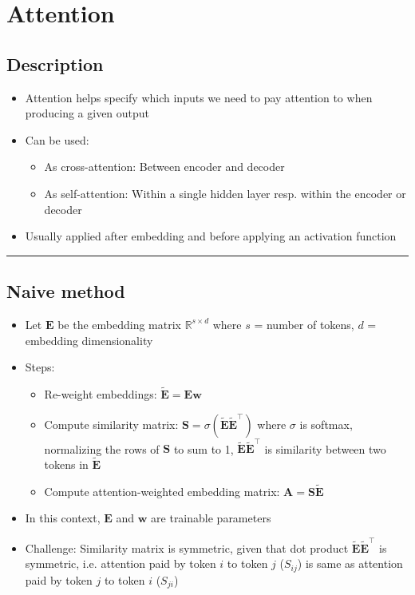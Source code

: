 \section{Attention}
\subsection*{Description}
\begin{itemize}
    \item Attention helps specify which inputs we need to pay attention to when producing a given output
    \item Can be used:
    \begin{itemize}
        \item As cross-attention: Between encoder and decoder
        \item As self-attention: Within a single hidden layer resp. within the encoder or decoder
    \end{itemize}
    \item Usually applied after embedding and before applying an activation function
\end{itemize}

{\color{black}\hrule height 0.001mm}

\subsection*{Naive method}
\begin{itemize}
    \item Let $\boldsymbol{E}$ be the embedding matrix $\mathbb{R}^{s \times d}$ where $s$ = number of tokens, $d$ = embedding dimensionality
    \item Steps:
    \begin{itemize}
        \item Re-weight embeddings: $\tilde{\boldsymbol{E}} = \boldsymbol{E} \boldsymbol{w}$
        \item Compute similarity matrix: $\boldsymbol{S} = \sigma( \tilde{\boldsymbol{E}} \tilde{\boldsymbol{E}}^\intercal )$ where $\sigma$ is softmax, normalizing the rows of $\boldsymbol{S}$ to sum to 1, $\tilde{\boldsymbol{E}} \tilde{\boldsymbol{E}}^\intercal$ is similarity between two tokens in $\tilde{\boldsymbol{E}}$
        \item Compute attention-weighted embedding matrix: $\boldsymbol{A} = \boldsymbol{S}\tilde{\boldsymbol{E}}$
    \end{itemize}
    \item In this context, $\boldsymbol{E}$ and $\boldsymbol{w}$ are trainable parameters
    \item Challenge: Similarity matrix is symmetric, given that dot product $\tilde{\boldsymbol{E}} \tilde{\boldsymbol{E}}^\intercal$ is symmetric, i.e. attention paid by token $i$ to token $j$ ($S_{ij}$) is same as attention paid by token $j$ to token $i$ ($S_{ji}$)
\end{itemize}

